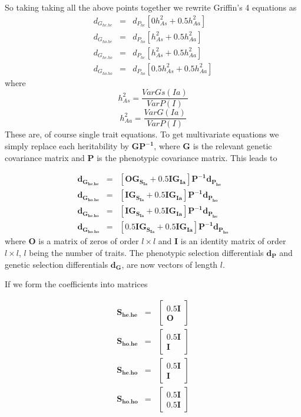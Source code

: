 \documentclass[titlepage]{article}  %
\begin{document}
So taking taking all the above points together we rewrite Griffin's 4 equations as
\begin{eqnarray*}
d_{G_{he.he}} & = & d_{P_{he}}[0 h^{2}_{As} + 0.5 h^{2}_{Aa}] \\
d_{G_{ho.he}} & = & d_{P_{ho}}[ h^{2}_{As} + 0.5 h^{2}_{Aa}] \\
d_{G_{he.ho}} & = & d_{P_{he}}[ h^{2}_{As} + 0.5 h^{2}_{Aa}] \\
d_{G_{ho.ho}} & = & d_{P_{ho}}[ 0.5 h^{2}_{As} + 0.5 h^{2}_{Aa}]
\end{eqnarray*}
where
\begin{displaymath}
h^{2}_{As} = \frac{VarGs(Ia)}{VarP(I)}
\end{displaymath}
\begin{displaymath}
h^{2}_{Aa} = \frac{VarG(Ia)}{VarP(I)}
\end{displaymath}
These are, of course single trait equations. 
To get multivariate equations we simply replace each heritability by $\bm{GP^{-1}}$, where $\bm{G}$ is the relevant genetic covariance matrix and $\bm{P}$ is the phenotypic covariance matrix. This leads to

\begin{eqnarray*}
\bm{d_{G_{he.he}}} & = & \bm{[O G_{S_{Ia}} + 0.5 I G_{Ia}] P^{-1}d_{P_{he}} } \\
\bm{d_{G_{ho.he}}} & = & \bm{[I G_{S_{Ia}}  + 0.5 I G_{Ia}] P^{-1}d_{P_{ho}} } \\
\bm{d_{G_{he.ho}}} & = & \bm{[I G_{S_{Ia}}  + 0.5 I G_{Ia}] P^{-1}d_{P_{he}} } \\
\bm{d_{G_{ho.ho}}} & = & \bm{[ 0.5 I G_{S_{Ia}} + 0.5 I G_{Ia}] P^{-1}d_{P_{ho}} }
\end{eqnarray*}
where $\bm{O}$ is a matrix of zeros of order $l \times l$ and $\bm{I}$ is an identity matrix of order  $l \times l$, $l$ being the number of traits. The phenotypic selection differentials $\bm{d_{P}}$ and genetic selection differentials $\bm{d_{G}}$, are now vectors of length $l$.

If we form the coefficients into matrices

\begin{eqnarray*}
\bm{S_{he.he}} & = & 
\left[ \begin{array}{c}
0.5 \bm{I} \\
\bm{O}
\end{array} \right] \\
\bm{S_{ho.he}} & = &
\left[ \begin{array}{c}
0.5 \bm{I} \\
\bm{I}
\end{array} \right] \\
\bm{S_{he.ho}} & = &
\left[ \begin{array}{c}
0.5 \bm{I} \\
\bm{I}
\end{array} \right] \\
\bm{S_{ho.ho}} & = &
\left[ \begin{array}{c}
0.5 \bm{I} \\
0.5 \bm{I}
\end{array} \right] 
\end{eqnarray*}
\end{document}
